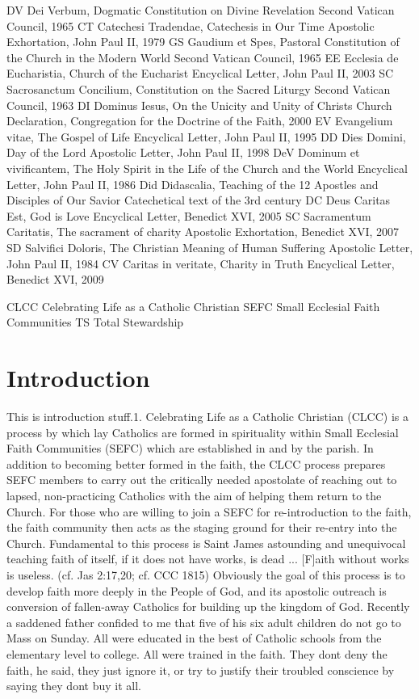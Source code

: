 \documentclass[oneside]{book}
\begin{document}
DV Dei Verbum, Dogmatic Constitution on Divine Revelation Second Vatican
Council, 1965 CT Catechesi Tradendae, Catechesis in Our Time Apostolic
Exhortation, John Paul II, 1979 GS Gaudium et Spes, Pastoral Constitution of the
Church in the Modern World Second Vatican Council, 1965 EE Ecclesia de
Eucharistia, Church of the Eucharist Encyclical Letter, John Paul II, 2003 SC
Sacrosanctum Concilium, Constitution on the Sacred Liturgy Second Vatican
Council, 1963 DI Dominus Iesus, On the Unicity and Unity of Christs Church
Declaration, Congregation for the Doctrine of the Faith, 2000 EV Evangelium
vitae, The Gospel of Life Encyclical Letter, John Paul II, 1995 DD Dies Domini,
Day of the Lord Apostolic Letter, John Paul II, 1998 DeV Dominum et
vivificantem, The Holy Spirit in the Life of the Church and the World Encyclical
Letter, John Paul II, 1986 Did Didascalia, Teaching of the 12 Apostles and
Disciples of Our Savior Catechetical text of the 3rd century DC Deus Caritas
Est, God is Love Encyclical Letter, Benedict XVI, 2005 SC Sacramentum Caritatis,
The sacrament of charity Apostolic Exhortation, Benedict XVI, 2007 SD Salvifici
Doloris, The Christian Meaning of Human Suffering Apostolic Letter, John Paul
II, 1984 CV Caritas in veritate, Charity in Truth Encyclical Letter, Benedict
XVI, 2009

CLCC Celebrating Life as a Catholic Christian SEFC Small Ecclesial Faith
Communities TS Total Stewardship


\chapter{Introduction}

This is introduction stuff.1. Celebrating Life as a Catholic Christian (CLCC) is
a process by which lay Catholics are formed in spirituality within Small
Ecclesial Faith Communities (SEFC) which are established in and by the
parish. In addition to becoming better formed in the faith, the CLCC process
prepares SEFC members to carry out the critically needed apostolate of reaching
out to lapsed, non-practicing Catholics with the aim of helping them return to
the Church. For those who are willing to join a SEFC for re-introduction to the
faith, the faith community then acts as the staging ground for their re-entry
into the Church. Fundamental to this process is Saint James astounding and
unequivocal teaching faith of itself, if it does not have works, is dead
... [F]aith without works is useless. (cf. Jas 2:17,20; cf. CCC 1815) Obviously
the goal of this process is to develop faith more deeply in the People of God,
and its apostolic outreach is conversion of fallen-away Catholics for building
up the kingdom of God.  Recently a saddened father confided to me that five of
his six adult children do not go to Mass on Sunday. All were educated in the
best of Catholic schools from the elementary level to college. All were trained
in the faith. They dont deny the faith, he said, they just ignore it, or try to
justify their troubled conscience by saying they dont buy it all.
\end{document}
